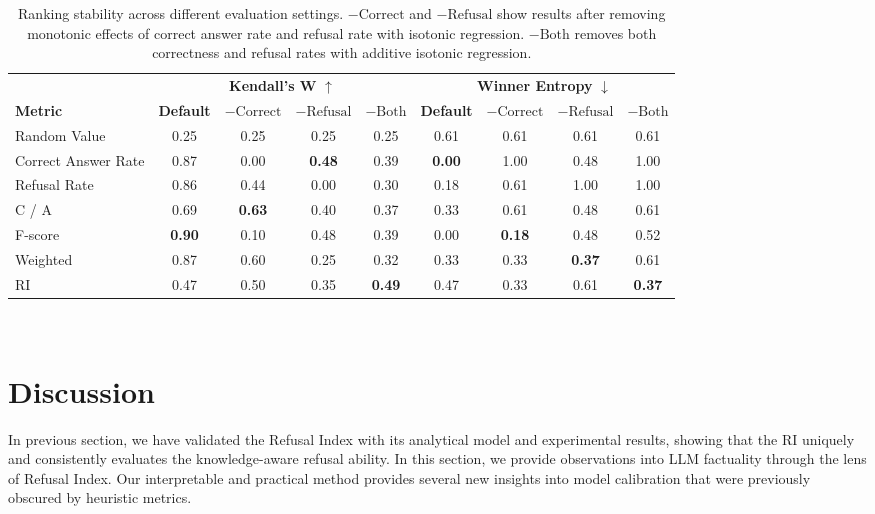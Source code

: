 \documentclass{article} %
\theoremstyle{definition}
\begin{document}
\begin{table}[t]
    \centering
    \small
    \caption{Ranking stability across different evaluation settings. $-\text{Correct}$ and $-\text{Refusal}$ show results after removing monotonic effects of correct answer rate and refusal rate with isotonic regression. $- \text{Both}$ removes both correctness and refusal rates with additive isotonic regression.}
    \label{tab:ranking_stability}
    \setlength{\tabcolsep}{4pt}
    \begin{tabular}{lcccccccc}
        \toprule
         & \multicolumn{4}{c}{\textbf{Kendall's W} $\uparrow$} & \multicolumn{4}{c}{\textbf{Winner Entropy} $\downarrow$} \\
        \cmidrule(lr){2-5} \cmidrule(lr){6-9}
        \textbf{Metric} & \textbf{Default} & \textbf{$- \text{Correct}$} & \textbf{$- \text{Refusal}$} & \textbf{$- \text{Both}$} & \textbf{Default} & \textbf{$- \text{Correct}$} & \textbf{$- \text{Refusal}$} & \textbf{$- \text{Both}$} \\
        \midrule
        Random Value  & 0.25 & 0.25 & 0.25 & 0.25 & 0.61 & 0.61 & 0.61 & 0.61 \\
        Correct Answer Rate & 0.87 & 0.00 & \textbf{0.48} & 0.39 & \textbf{0.00} & 1.00 & 0.48 & 1.00 \\
        Refusal Rate & 0.86 & 0.44 & 0.00 & 0.30 & 0.18 & 0.61 & 1.00 & 1.00 \\
        \midrule
        C / A    & 0.69 & \textbf{0.63} & 0.40 & 0.37 & 0.33 & 0.61 & 0.48 & 0.61 \\
        F-score  & \textbf{0.90} & 0.10 & 0.48 & 0.39 & 0.00 & \textbf{0.18} & 0.48 & 0.52 \\
        Weighted & 0.87 & 0.60 & 0.25 & 0.32 & 0.33 & 0.33 & \textbf{0.37} & 0.61 \\
        RI       & 0.47 & 0.50 & 0.35 & \textbf{0.49} & 0.47 & 0.33 & 0.61 & \textbf{0.37} \\
        \bottomrule
    \end{tabular}%
    \\
\end{table}


\section{Discussion}
\label{sec:discussion}

In previous section, we have validated the Refusal Index with its analytical model and experimental results, showing that the RI uniquely and consistently evaluates the knowledge-aware refusal ability. In this section, we provide observations into LLM factuality through the lens of Refusal Index. Our interpretable and practical method provides several new insights into model calibration that were previously obscured by heuristic metrics. 
\end{document}
